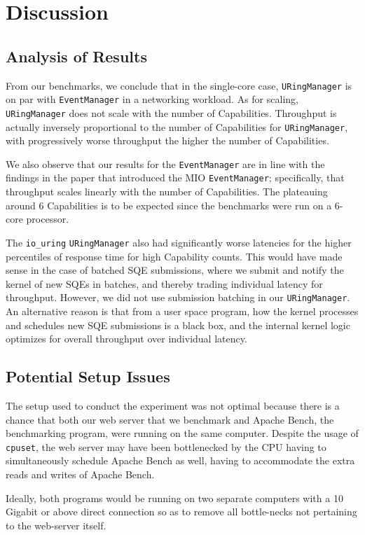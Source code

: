 \chapter{Discussion}
\section{Analysis of Results} 
From our benchmarks, we conclude that in the single-core case, \texttt{URingManager} is on par with \texttt{EventManager} in a networking workload. As for scaling, \texttt{URingManager} does not scale with the number of Capabilities. Throughput is actually inversely proportional to the number of Capabilities for \texttt{URingManager}, with progressively worse throughput the higher the number of Capabilities.

We also observe that our results for the \texttt{EventManager} are in line with the findings in the paper that introduced the MIO \texttt{EventManager}; specifically, that throughput scales linearly with the number of Capabilities. The plateauing around 6 Capabilities is to be expected since the benchmarks were run on a 6-core processor.

The  \texttt{io\_uring} \texttt{URingManager} also had significantly worse latencies for the higher percentiles of response time for high Capability counts. This would have made sense in the case of batched SQE submissions, where we submit and notify the kernel of new SQEs in batches, and thereby trading individual latency for throughput. However, we did not use submission batching in our \texttt{URingManager}. An alternative reason is that from a user space program, how the kernel processes and schedules new SQE submissions is a black box, and the internal kernel logic optimizes for overall throughput over individual latency.

\section{Potential Setup Issues}
The setup used to conduct the experiment was not optimal because there is a chance that both our web server that we benchmark and Apache Bench, the benchmarking program, were running on the same computer. Despite the usage of \texttt{cpuset}, the web server may have been bottlenecked by the CPU having to simultaneously schedule Apache Bench as well, having to accommodate the extra reads and writes of Apache Bench.

Ideally, both programs would be running on two separate computers with a 10 Gigabit or above direct connection so as to remove all bottle-necks not pertaining to the web-server itself.

